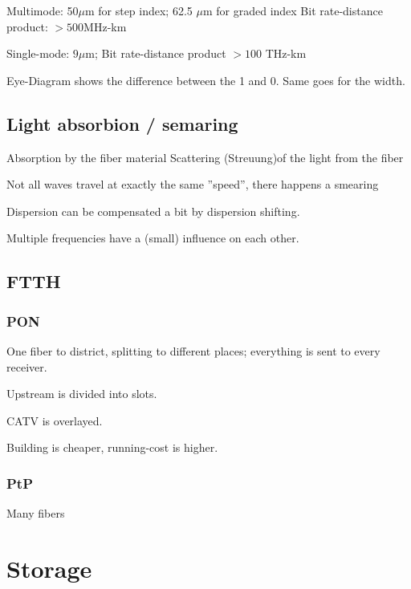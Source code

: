 Multimode: 50$\mu$m for step index; 62.5 $\mu$m for graded index
Bit rate-distance product: $>500$MHz-km

Single-mode: $9\mu$m;
Bit rate-distance product $>100$ THz-km


Eye-Diagram shows the difference between the 1 and 0. Same goes for the width.

\subsection{Light absorbion / semaring}

Absorption by the fiber material
Scattering (Streuung)of the light from the fiber

Not all waves travel at exactly the same ''speed'', there happens a smearing

Dispersion can be compensated a bit by dispersion shifting.


Multiple frequencies have a (small) influence on each other.


\subsection{FTTH}

\subsubsection{PON}

One fiber to district, splitting to different places; everything is sent to every receiver.

Upstream is divided into slots.

CATV is overlayed.

Building is cheaper, running-cost is higher.

\subsubsection{PtP}


Many fibers

\subsubsection{}


\section{Storage}

